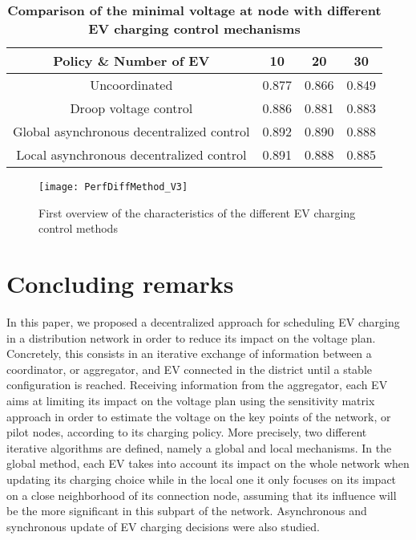 \documentclass[journal]{IEEEtran}
\begin{document}
\begin{table}[h]
\caption{\textbf{Comparison of the minimal voltage at node  with different EV charging control mechanisms}}
\label{tab:perfV}
\begin{center}
\begin{tabular}{|c|c|c|c|}
\hline
Policy \& Number of EV & 10 & 20 & 30 \\
 \hline
Uncoordinated &	0.877 & 0.866 & 0.849 \\
\hline
Droop voltage control &	0.886 & 0.881 & 0.883 \\
\hline
Global asynchronous decentralized control &	0.892 & 0.890 & 0.888 \\ 
\hline
Local asynchronous decentralized control & 0.891 & 0.888 & 0.885 \\
\hline
\end{tabular}
\end{center}
\end{table}

\begin{figure}[!htbp]
\centering
\texttt{[image: PerfDiffMethod\_V3]}
\caption{First overview of the characteristics of the different EV charging control methods}
\label{Fig:PerfDiffMeth}
\end{figure}

\section{Concluding remarks}


In this paper, we proposed a decentralized approach for scheduling EV charging in a distribution network in order to reduce its impact on the voltage plan. Concretely, this consists in an iterative exchange of information between a coordinator, or aggregator, and EV connected in the district until a stable configuration is reached. Receiving information from the aggregator, each EV aims at limiting its impact on the voltage plan using the sensitivity matrix approach in order to estimate the voltage on the key points of the network, or pilot nodes, according to its charging policy. More precisely, two different iterative algorithms are defined, namely a global and local mechanisms. In the global method, each EV takes into account its impact on the whole network when updating its charging choice while in the local one it only focuses on its impact on a close neighborhood of its connection node, assuming that its influence will be the more significant in this subpart of the network. Asynchronous and synchronous update of EV charging decisions were also studied. 
\end{document}

